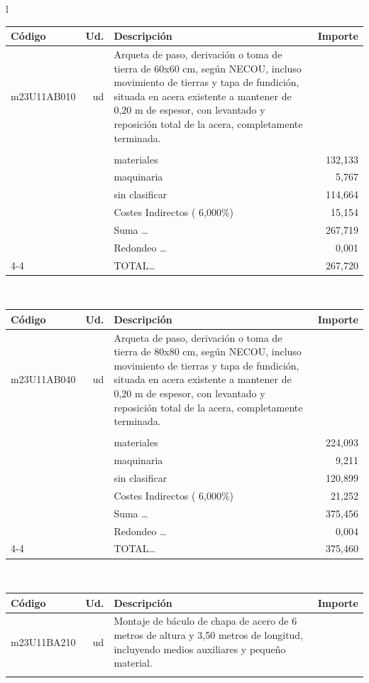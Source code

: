 \documentclass{book}%
\begin{document}
\begin{longtable}{l}
\begin{tabular}{l r p{60mm} r}%
Código&Ud.&Descripción&Importe\\%
\hline%
m23U11AB010&ud&Arqueta de paso, derivación o toma de tierra de 60x60 cm, según NECOU, incluso movimiento de tierras y tapa de fundición, situada en acera existente a mantener de 0,20 m de espesor, con levantado y reposición total de la acera, completamente terminada.&\\%
&&&\\%
&&materiales&   132,133\\%
&&maquinaria&     5,767\\%
&&sin clasificar&   114,664\\%
&&Costes Indirectos (     6,000\%)&    15,154\\%
&&Suma \ldots&   267,719\\%
&&Redondeo \ldots&     0,001\\%
\cline{4-4}%
&&TOTAL\ldots&   267,720\\%
\end{tabular}\\%
\begin{tabular}{l r p{60mm} r}%
Código&Ud.&Descripción&Importe\\%
\hline%
m23U11AB040&ud&Arqueta de paso, derivación o toma de tierra de 80x80 cm, según NECOU, incluso movimiento de tierras y tapa de fundición, situada en acera existente a mantener de 0,20 m de espesor, con levantado y reposición total de la acera, completamente terminada.&\\%
&&&\\%
&&materiales&   224,093\\%
&&maquinaria&     9,211\\%
&&sin clasificar&   120,899\\%
&&Costes Indirectos (     6,000\%)&    21,252\\%
&&Suma \ldots&   375,456\\%
&&Redondeo \ldots&     0,004\\%
\cline{4-4}%
&&TOTAL\ldots&   375,460\\%
\end{tabular}\\%
\begin{tabular}{l r p{60mm} r}%
Código&Ud.&Descripción&Importe\\%
\hline%
m23U11BA210&ud&Montaje de báculo de chapa de acero de 6 metros de altura y 3,50 metros de longitud, incluyendo medios auxiliares y pequeño material.&\\%
&&&\\%

\end{tabular}
\end{longtable}
\end{document}
